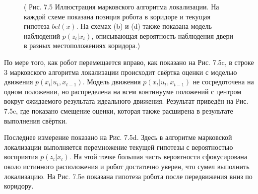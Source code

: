 \documentclass[10pt,a4paper]{article}
\begin{document}
\begin{figure}[H]
	\caption{ (  Рис. 7.5 Иллюстрация марковского алгоритма локализации. На каждой схеме показана позиция робота в коридоре и текущая гипотеза $bel(x)$. На схемах (b) и (d) также показана модель наблюдений $p(z_t | x_t)$, описывающая вероятность наблюдения двери в разных местоположениях коридора.)}
	\label{fig:75orig}
\end{figure} 

По мере того, как робот перемещается вправо, как показано на Рис. 7.5c, в строке 3 марковского алгоритма локализации происходит свёртка оценки с моделью движения $p(x_t | u_t, x_{t-1})$. Модель движения $p(x_t | u_t, x_{t-1})$ не сосредоточена на одном положении, но распределена на всем континууме положений с центром вокруг ожидаемого результата идеального движения. Результат приведён на Рис. 7.5c, где показано смещение оценки, которая также расширена в результате выполнения свёртки. 

Последнее измерение показано на Рис. 7.5d. Здесь в алгоритме марковской локализации выполняется перемножение текущей гипотезы с вероятностью восприятия $p(z_t | x_t)$. На этой точке большая часть вероятности сфокусирована около истинного расположения и робот достаточно уверен, что сумел выполнить локализацию. 
На Рис. 7.5e показана гипотеза робота после передвижения вниз по коридору. 
\end{document}
